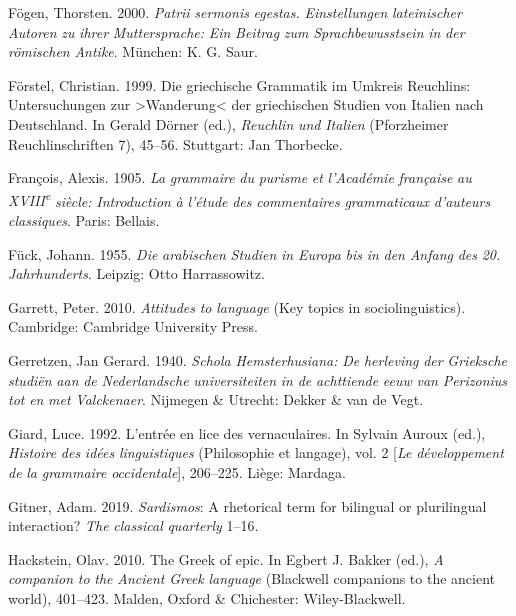 Fögen, Thorsten. 2000. \textit{Patrii} \textit{sermonis} \textit{egestas.} \textit{Einstellungen} \textit{lateinischer} \textit{Autoren} \textit{zu} \textit{ihrer} \textit{Muttersprache:} \textit{Ein} \textit{Beitrag} \textit{zum} \textit{Sprachbewusstsein} \textit{in} \textit{der} \textit{römischen} \textit{Antike}. München: K. G. Saur.

Förstel, Christian. 1999. Die griechische Grammatik im Umkreis Reuchlins: Untersuchungen zur >Wanderung< der griechischen Studien von Italien nach Deutschland. In Gerald Dörner (ed.), \textit{Reuchlin} \textit{und} \textit{Italien} (Pforzheimer Reuchlinschriften 7), 45–56. Stuttgart: Jan Thorbecke.

François, Alexis. 1905. \textit{La} \textit{grammaire} \textit{du} \textit{purisme} \textit{et} \textit{l’Académie} \textit{française} \textit{au} \textit{XVIII\textsuperscript{e}} \textit{siècle:} \textit{Introduction} \textit{à} \textit{l’étude} \textit{des} \textit{commentaires} \textit{grammaticaux} \textit{d’auteurs} \textit{classiques}. Paris: Bellais.

Fück, Johann. 1955. \textit{Die} \textit{arabischen} \textit{Studien} \textit{in} \textit{Europa} \textit{bis} \textit{in} \textit{den} \textit{Anfang} \textit{des} \textit{20.} \textit{Jahrhunderts}. Leipzig: Otto Harrassowitz.

Garrett, Peter. 2010. \textit{Attitudes} \textit{to} \textit{language} (Key topics in sociolinguistics). Cambridge: Cambridge University Press.

Gerretzen, Jan Gerard. 1940. \textit{Schola} \textit{Hemsterhusiana:} \textit{De} \textit{herleving} \textit{der} \textit{Grieksche} \textit{studiën} \textit{aan} \textit{de} \textit{Nederlandsche} \textit{universiteiten} \textit{in} \textit{de} \textit{achttiende} \textit{eeuw} \textit{van} \textit{Perizonius} \textit{tot} \textit{en} \textit{met} \textit{Valckenaer}. Nijmegen \& Utrecht: Dekker \& van de Vegt.

Giard, Luce. 1992. L’entrée en lice des vernaculaires. In Sylvain Auroux (ed.), \textit{Histoire} \textit{des} \textit{idées} \textit{linguistiques} (Philosophie et langage), vol. 2 [\textit{Le} \textit{développement} \textit{de} \textit{la} \textit{grammaire} \textit{occidentale}], 206–225. Liège: Mardaga.

Gitner, Adam. 2019. \textit{Sardismos}: A rhetorical term for bilingual or plurilingual interaction? \textit{The} \textit{classical} \textit{quarterly} 1–16.

Hackstein, Olav. 2010. The Greek of epic. In Egbert J. Bakker (ed.), \textit{A} \textit{companion} \textit{to} \textit{the} \textit{Ancient} \textit{Greek} \textit{language} (Blackwell companions to the ancient world), 401–423. Malden, Oxford \& Chichester: Wiley-Blackwell.

